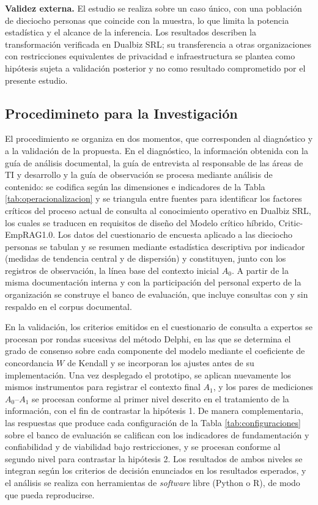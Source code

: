 \textbf{Validez externa.} El estudio se realiza sobre un caso único, con una población de dieciocho personas que coincide con la muestra, lo que limita la potencia estadística y el alcance de la inferencia. Los resultados describen la transformación verificada en Dualbiz SRL; su transferencia a otras organizaciones con restricciones equivalentes de privacidad e infraestructura se plantea como hipótesis sujeta a validación posterior y no como resultado comprometido por el presente estudio.

\subsection{Procedimineto para la Investigación}
El procedimiento se organiza en dos momentos, que corresponden al diagnóstico y a la validación de la propuesta. En el diagnóstico, la información
obtenida con la guía de análisis documental, la guía de entrevista al responsable de las áreas de TI y desarrollo y la guía de observación se
procesa mediante análisis de contenido: se codifica según las dimensiones e indicadores de la Tabla \ref{tab:operacionalizacion} y se triangula
entre fuentes para identificar los factores críticos del proceso actual de consulta al conocimiento operativo en Dualbiz SRL, los cuales se traducen
en requisitos de diseño del Modelo crítico híbrido, Critic-EmpRAG1.0. Los datos del cuestionario de encuesta aplicado a las dieciocho personas se tabulan y
se resumen mediante estadística descriptiva por indicador (medidas de tendencia central y de dispersión) y constituyen, junto con los registros de
observación, la línea base del contexto inicial $A_0$. A partir de la misma documentación interna y con la participación del personal experto de la
organización se construye el banco de evaluación, que incluye consultas con y sin respaldo en el corpus documental.

En la validación, los criterios emitidos en el cuestionario de consulta a expertos se procesan por rondas sucesivas del método Delphi, en las que se
determina el grado de consenso sobre cada componente del modelo mediante el coeficiente de concordancia $W$ de Kendall y se incorporan los ajustes
antes de su implementación. Una vez desplegado el prototipo, se aplican nuevamente los mismos instrumentos para registrar el contexto final $A_1$, y
los pares de mediciones $A_0$--$A_1$ se procesan conforme al primer nivel descrito en el tratamiento de la información, con el fin de contrastar la
hipótesis 1. De manera complementaria, las respuestas que produce cada configuración de la Tabla \ref{tab:configuraciones} sobre el banco de
evaluación se califican con los indicadores de fundamentación y confiabilidad y de viabilidad bajo restricciones, y se procesan conforme al segundo
nivel para contrastar la hipótesis 2. Los resultados de ambos niveles se integran según los criterios de decisión enunciados en los resultados
esperados, y el análisis se realiza con herramientas de \textit{software} libre (Python o R), de modo que pueda reproducirse.


